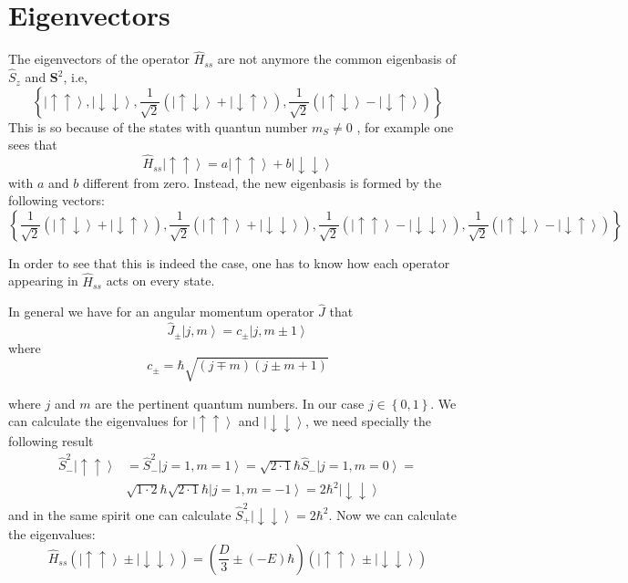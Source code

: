 \documentclass[A4paper, 12pt]{article}
\newcommand{\uu}{\left | \uparrow\uparrow \right \rangle}
\newcommand{\dd}{\left | \downarrow\downarrow \right \rangle}
\newcommand{\du}{\left | \downarrow\uparrow \right \rangle}
\newcommand{\ud}{\left | \uparrow\downarrow \right \rangle}
\newcommand{\mone}{\frac{1}{\sqrt{2}}\left( \ud + \du\right)}
\newcommand{\mmone}{\frac{1}{\sqrt{2}}\left( \ud - \du\right)}
\newcommand{\x}{\frac{1}{\sqrt 2}\left( \uu + \dd\right)}
\newcommand{\y}{\frac{1}{\sqrt 2}\left( \uu - \dd\right)}
\begin{document}
\section{Eigenvectors}
\label{sec:eigenvectors}

The eigenvectors of the operator $ \hat{H} _{ss}   $ are not anymore the common eigenbasis of $ \hat{S}_{z} $ and $ \mathbf{S}^{2}  $, i.e,
\begin{equation}
  \left\{
    \uu, \dd, \mone, \mmone
  \right\}
\end{equation}
This is so because of the states with quantun number $ m_S \neq 0 $ , for example one sees that
\begin{equation}
  \hat{H} _{ss} \uu = a\uu + b \dd
\end{equation}
with $ a $ and $ b $ different from zero.
Instead, the new eigenbasis is formed by the following vectors:
\begin{equation}
  \left\{\mone, \x, \y, \mmone \right\}
\end{equation}

In order to see that this is indeed the case, one has to know how each operator appearing in $ \hat{H} _{ss}  $  acts on every state.

In general we have for an angular momentum operator $ \hat{J}  $ that
\begin{equation}
  \hat{J} _{\pm} \left | j, m \right \rangle = c _{\pm} \left | j,m \pm 1 \right \rangle
\end{equation}
where
\begin{equation}
  c _{\pm}  = \hbar \sqrt{(j\mp m)(j \pm m +1)}
\end{equation}

where $ j $ and $ m $ are the pertinent quantum numbers. In our case $ j \in \left \{0,1 \right \}  $.
We can calculate the eigenvalues for $ \uu $ and $ \dd $, we need specially the following result
\begin{align*}
  \hat{S} _{-} ^{2} \uu &=
  \hat{S} _{-} ^{2} \left | j=1, m=1 \right \rangle =
  \sqrt{2\cdot 1} \hbar \hat{S} _{-}  \left | j=1, m=0 \right \rangle = \\
  &
  \sqrt{1\cdot 2} \hbar  \sqrt{2\cdot 1} \hbar  \left | j=1, m=-1 \right \rangle =
  2\hbar ^{2} \dd
\end{align*}
and in the same spirit one can calculate $ \hat{S} _{+} ^{2} \dd = 2 \hbar ^{2}  $.
Now we can calculate the eigenvalues:
\begin{equation}
  \hat{H} _{ss} \left( \uu \pm \dd \right)
  =
  \left(
    \frac{D}{3}\pm (-E)\hbar
  \right)
  \left(
    \uu \pm \dd
  \right)
\end{equation}
\end{document}
